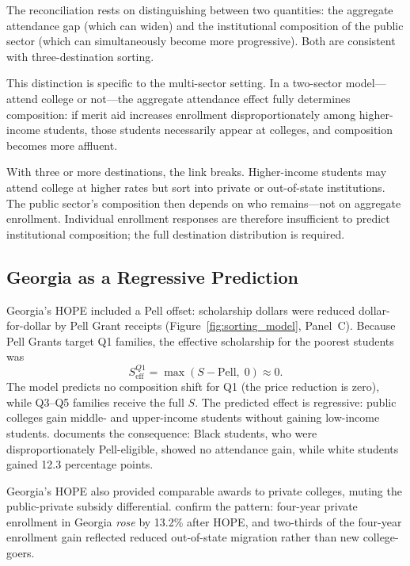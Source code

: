 The reconciliation rests on distinguishing between two quantities: the
aggregate attendance gap (which can widen) and the institutional
composition of the public sector (which can simultaneously become more
progressive). Both are consistent with three-destination sorting.

This distinction is specific to the multi-sector setting. In a
two-sector model---attend college or not---the aggregate attendance
effect fully determines composition: if merit aid increases enrollment
disproportionately among higher-income students, those students
necessarily appear at colleges, and composition becomes more affluent.

With three or more destinations, the link breaks. Higher-income
students may attend college at higher rates but sort into private or
out-of-state institutions. The public sector's composition then depends
on who remains---not on aggregate enrollment. Individual enrollment
responses are therefore insufficient to predict institutional
composition; the full destination distribution is required.

\subsection{Georgia as a Regressive Prediction}
\label{sec:theory_georgia}

Georgia's HOPE included a Pell offset: scholarship dollars were reduced
dollar-for-dollar by Pell Grant receipts (Figure~\ref{fig:sorting_model}, Panel~C). Because Pell Grants target Q1
families, the effective scholarship for the poorest students was
\begin{equation}
  S_{\text{eff}}^{Q1} = \max(S - \text{Pell},\; 0) \approx 0.
\end{equation}
The model predicts no composition shift for Q1 (the price reduction is
zero), while Q3--Q5 families receive the full $S$. The predicted effect
is regressive: public colleges gain middle- and upper-income students
without gaining low-income students. \textcite{dynarski2000hope}
documents the consequence: Black students, who were disproportionately
Pell-eligible, showed no attendance gain, while white students gained
12.3 percentage points.

Georgia's HOPE also provided comparable awards to private colleges,
muting the public-private subsidy differential.
\textcite{cornwell2006enrollment} confirm the pattern: four-year private
enrollment in Georgia \emph{rose} by 13.2\% after HOPE, and two-thirds
of the four-year enrollment gain reflected reduced out-of-state
migration rather than new college-goers.

